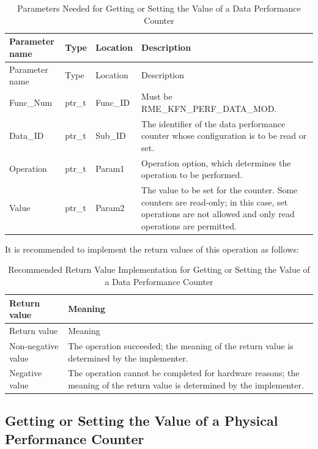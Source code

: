 \begin{xltabular}{\textwidth}{@{}>{\hsize\raggedright\arraybackslash}X>{\hsize\raggedright\arraybackslash}X>{\hsize\raggedright\arraybackslash}X>{\hsize\raggedright\arraybackslash}X@{}}
\caption{Parameters Needed for Getting or Setting the Value of a Data Performance Counter}\label{tab:8-66-get-or-set-data-performance-counter-parameters}\\
\toprule
Parameter name & Type & Location & Description\tabularnewline
\endfirsthead
\toprule
Parameter name & Type & Location & Description\tabularnewline
\midrule
\endhead
\bottomrule
\endlastfoot
Func\_Num & ptr\_t & Func\_ID & Must be RME\_KFN\_PERF\_DATA\_MOD.\tabularnewline
Data\_ID & ptr\_t & Sub\_ID &
The identifier of the data performance counter whose configuration is to be read or set.\tabularnewline
Operation & ptr\_t & Param1 &
Operation option, which determines the operation to be performed.\tabularnewline
Value & ptr\_t & Param2 &
The value to be set for the counter. Some counters are read-only; in this case, set operations are not allowed and only read operations are permitted.\tabularnewline
\end{xltabular}
\nopagebreak[4]

It is recommended to implement the return values of this operation as follows:

\begin{xltabular}{\textwidth}{@{}>{\hsize\raggedright\arraybackslash}X>{\hsize\raggedright\arraybackslash}X@{}}
\caption{Recommended Return Value Implementation for Getting or Setting the Value of a Data Performance Counter}\label{tab:8-67-get-or-set-data-performance-counter-suggested-return-values}\\
\toprule
Return value & Meaning\tabularnewline
\endfirsthead
\toprule
Return value & Meaning\tabularnewline
\midrule
\endhead
\bottomrule
\endlastfoot
    Non-negative value & The operation succeeded; the meaning of the return value is determined by the implementer.\tabularnewline
    Negative value & The operation cannot be completed for hardware reasons; the meaning of the return value is determined by the implementer.\tabularnewline
\end{xltabular}
\nopagebreak[4]

\subsection{Getting or Setting the Value of a Physical Performance Counter}\label{subsec:8-get-or-set-physical-performance-counter}


